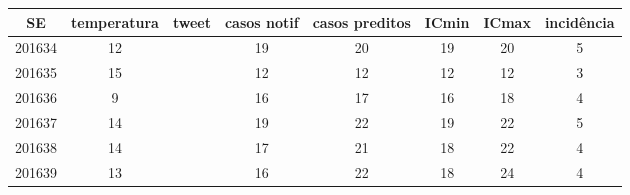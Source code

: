 \begin{tabular}{c|ccccccc}
  \hline
SE & temperatura & tweet & casos notif & casos preditos & ICmin & ICmax & incidência \\ 
  \hline
201634 & 12 &  & 19 & 20 & 19 & 20 & 5 \\ 
  201635 & 15 &  & 12 & 12 & 12 & 12 & 3 \\ 
  201636 & 9 &  & 16 & 17 & 16 & 18 & 4 \\ 
  201637 & 14 &  & 19 & 22 & 19 & 22 & 5 \\ 
  201638 & 14 &  & 17 & 21 & 18 & 22 & 4 \\ 
  201639 & 13 &  & 16 & 22 & 18 & 24 & 4 \\ 
   \hline
\end{tabular}
